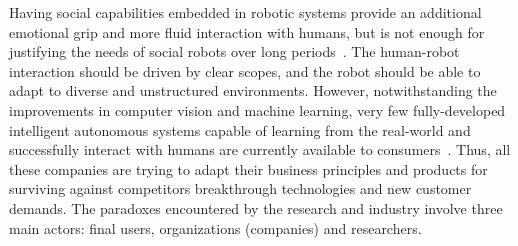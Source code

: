 \documentclass[11pt,a4paper]{report}
\begin{document}
Having social capabilities embedded in robotic systems provide an additional
emotional grip and more fluid interaction with humans, but is not enough for
justifying the needs of social robots over long periods~\cite{leite2013social,
baraka2019extended}. The human-robot interaction should be driven by clear
scopes, and the robot should be able to adapt to diverse and unstructured
environments. However, notwithstanding the improvements in computer vision and
machine learning, very few fully-developed intelligent autonomous systems
capable of learning from the real-world and successfully interact with humans
are currently available to consumers~\cite{dereshev2019longterm}. Thus, all
these companies are trying to adapt their business principles and products for
surviving against competitors breakthrough technologies and new customer
demands. The paradoxes encountered by the research and industry involve three
main actors: final users, organizations (companies) and researchers.

~\cite{hoffman2019anki}
\end{document}
